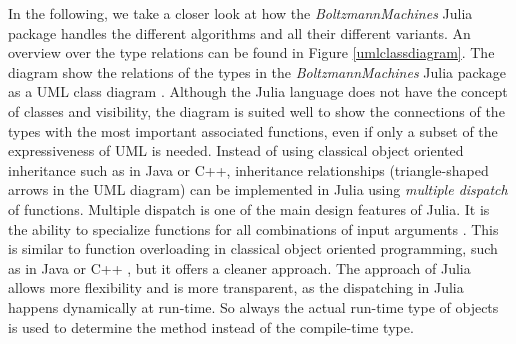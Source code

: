 \documentclass[12pt]{article}
\newcommand{\apkg}[1]{\emph{#1}}
\begin{document}
In the following, we take a closer look at how the \apkg{BoltzmannMachines} Julia package handles the different algorithms and all their different variants.
An overview over the type relations can be found in Figure \ref{umlclassdiagram}.
The diagram show the relations of the types in the \apkg{BoltzmannMachines} Julia package as a UML class diagram \citep{uml}.
Although the Julia language does not have the concept of classes and visibility, the diagram is suited well to show the connections of the types with the most important associated functions, even if only a subset of the expressiveness of UML is needed.
Instead of using classical object oriented inheritance such as in Java or C++, inheritance relationships (triangle-shaped arrows in the UML diagram) can be implemented in Julia using {\em multiple dispatch} of functions.
Multiple dispatch is one of the main design features of Julia.
It is the ability to specialize functions for all combinations of input arguments \citep{zappa_nardelli_julia_2018}.
This is similar to function overloading in classical object oriented programming, such as in Java \citep{arnold2005java} or C++ \citep{cppstandard}, but it offers a cleaner approach.
The approach of Julia allows more flexibility and is more transparent, as the dispatching in Julia happens dynamically at run-time.
So always the actual run-time type of objects is used to determine the method instead of the compile-time type.
\end{document}

